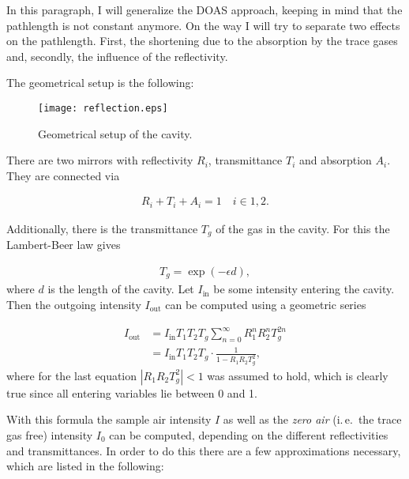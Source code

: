 In this paragraph, I will generalize the DOAS approach, keeping in mind
that the pathlength is not constant anymore. On the way I will try to
separate two effects on the pathlength. First, the shortening due to
the absorption by the trace gases and, secondly, the influence of the
reflectivity.

The geometrical setup is the following:

\begin{figure}[htbp]
  \centering
  \texttt{[image: reflection.eps]}
  \caption{Geometrical setup of the cavity.}
  \label{fig:cavity}
\end{figure}
There are two mirrors with reflectivity $R_i$, transmittance $T_i$
and absorption $A_i$. They are connected via

\begin{align*}
  R_i + T_i + A_i = 1 \quad i \in{1,2}.
\end{align*}

Additionally, there is the transmittance $T_g$ of the gas in the
cavity. For this the Lambert-Beer law gives

\begin{align*}
  T_g = \exp(-\epsilon d),
\end{align*}
where $d$ is the length of the cavity. Let $I_{\text{in}}$ be some
intensity entering the cavity. Then the outgoing intensity
$I_{\text{out}}$ can be computed using a geometric series

\begin{align}
  I_{\text{out}} & = I_{\text{in}} T_1 T_2 T_g \sum_{n=0}^\infty R_1^n R_2^n T_g^{2n}\nonumber\\
  & = I_{\text{in}} T_1 T_2 T_g \cdot \frac{1}{1 - R_1R_2T_g^2},\label{eq:geometric}
\end{align}
where for the last equation $|R_1R_2T_g^2| < 1$ was assumed to hold,
which is clearly true since all entering variables lie between 0 and
1.

With this formula the sample air intensity $I$ as well as the
\emph{zero air} (i.\,e.\ the trace gas free) intensity $I_0$ can be
computed, depending on the different reflectivities and
transmittances. In order to do this there are a few approximations
necessary, which are listed in the following:

